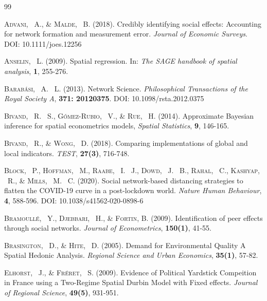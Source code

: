 \documentclass[times, doublespace]{auth}
\begin{document}


\begin{thebibliography}{99}	
	
	
\textsc{Advani, ~A., \& Malde, ~B.} (2018). Credibly identifying social effects: Accounting for network formation and measurement error. \textit{Journal of Economic Surveys}. DOI: 10.1111/joes.12256

\textsc{Anselin, ~L.} (2009). Spatial regression. In: \textit{The SAGE handbook of spatial analysis}, \textbf{1}, 255-276.

\textsc{Barabási, ~A. ~L.} (2013). Network Science. \textit{Philosophical Transactions of the Royal Society A}, \textbf{371: 20120375}. DOI: 10.1098/rsta.2012.0375

\textsc{Bivand, ~R. ~S., Gómez-Rubio, ~V., \& Rue, ~H.} (2014). Approximate Bayesian inference for spatial econometrics models, \textit{Spatial Statistics}, \textbf{9}, 146-165.

\textsc{Bivand, ~R., \& Wong, ~D.} (2018). Comparing implementations of global and local indicators. \textit{TEST}, \textbf{27(3)}, 716-748.

\textsc{Block, ~P., Hoffman, ~M., Raabe, ~I. ~J., Dowd, ~J. ~B., Rahal, ~C., Kashyap, ~R., \& Mills, ~M. ~C.} (2020). Social network-based distancing strategies to flatten the COVID-19 curve in a post-lockdown world. \textit{Nature Human Behaviour}, \textbf{4}, 588-596. DOI: 10.1038/s41562-020-0898-6

\textsc{Bramoull\'e, ~Y., Djebbari, ~H., \& Fortin, B.} (2009). Identification of peer effects through social networks. \textit{Journal of Econometrics}, \textbf{150(1)}, 41-55.

\textsc{Brasington, ~D., \& Hite, ~D.} (2005). Demand for Environmental Quality A Spatial Hedonic Analysis. \textit{Regional Science and Urban Economics}, \textbf{35(1)}, 57-82.

\textsc{Elhorst, ~J., \& Fr\'eret, ~S.} (2009). Evidence of Political Yardstick Compeition in France using a Two-Regime Spatial Durbin Model with Fixed effects. \textit{Journal of Regional Science}, \textbf{49(5)}, 931-951.


\end{thebibliography}
\end{document}
